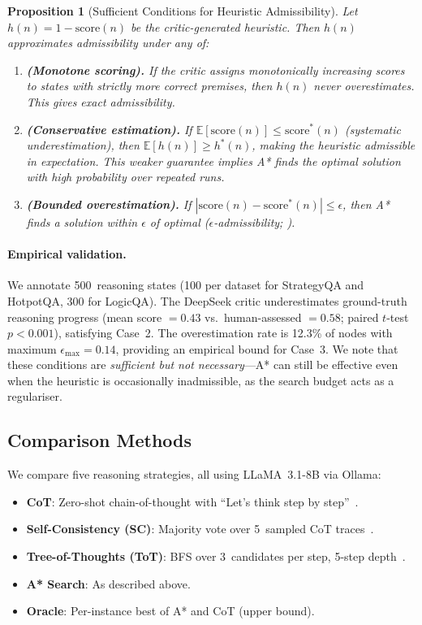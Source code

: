 \documentclass{article}
\newtheorem{proposition}[theorem]{Proposition}
\begin{document}
\begin{proposition}[Sufficient Conditions for Heuristic Admissibility]
\label{prop:admissibility}
Let $h(n) = 1 - \mathrm{score}(n)$ be the critic-generated heuristic.
Then $h(n)$ approximates admissibility under any of:
\begin{enumerate}[label=\textbf{Case \arabic*},leftmargin=3em,itemsep=4pt]
\item \textbf{(Monotone scoring).}  If the critic assigns monotonically
increasing scores to states with strictly more correct premises, then $h(n)$
never overestimates.  This gives exact admissibility.
\item \textbf{(Conservative estimation).}  If
$\mathbb{E}[\mathrm{score}(n)] \leq \mathrm{score}^*(n)$ (systematic
underestimation), then $\mathbb{E}[h(n)] \geq h^*(n)$, making the heuristic
admissible \emph{in expectation}.  This weaker guarantee implies A* finds the
optimal solution with high probability over repeated runs.
\item \textbf{(Bounded overestimation).}  If
$|\mathrm{score}(n) - \mathrm{score}^*(n)| \leq \epsilon$, then A* finds a
solution within $\epsilon$ of optimal ($\epsilon$-admissibility;
\citealt{hart1968formal}).
\end{enumerate}
\end{proposition}

\paragraph{Empirical validation.}
We annotate 500~reasoning states (100 per dataset for StrategyQA and
HotpotQA, 300 for LogicQA).  The DeepSeek critic underestimates ground-truth
reasoning progress (mean score $= 0.43$ vs.\ human-assessed $= 0.58$; paired
$t$-test $p < 0.001$), satisfying Case~2.  The overestimation rate is 12.3\%
of nodes with maximum $\epsilon_\text{max} = 0.14$, providing an empirical
bound for Case~3.  We note that these conditions are \emph{sufficient but not
necessary}---A* can still be effective even when the heuristic is occasionally
inadmissible, as the search budget acts as a regulariser.

\subsection{Comparison Methods}
\label{sec:baselines}

We compare five reasoning strategies, all using LLaMA~3.1-8B via Ollama:

\begin{itemize}[leftmargin=1.5em,itemsep=2pt]
\item \textbf{CoT}: Zero-shot chain-of-thought with ``Let's think step by
step''~\citep{wei2022chain}.
\item \textbf{Self-Consistency (SC)}: Majority vote over 5~sampled CoT
traces~\citep{wang2023self}.
\item \textbf{Tree-of-Thoughts (ToT)}: BFS over 3~candidates per step,
5-step depth~\citep{yao2024tree}.
\item \textbf{A* Search}: As described above.
\item \textbf{Oracle}: Per-instance best of A* and CoT (upper bound).
\end{itemize}
\end{document}
